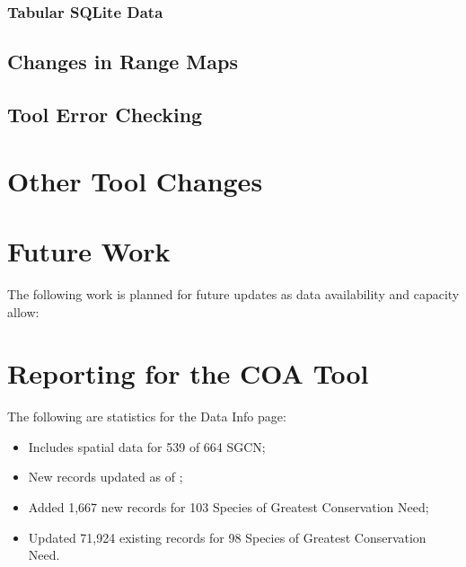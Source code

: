 \documentclass{article}\usepackage[]{graphicx}\usepackage[table]{xcolor}
\begin{document}
\subsubsection*{Tabular SQLite Data}
\noindent  

\subsection*{Changes in Range Maps}
\noindent  

\subsection*{Tool Error Checking}
\noindent  

\section*{Other Tool Changes}
\noindent 

\section*{Future Work}
The following work is planned for future updates as data availability and capacity allow:
\begin{itemize}
 
\end{itemize} 

\section*{Reporting for the COA Tool}

The following are statistics for the Data Info page: 
\begin{itemize}
 \item{Includes spatial data for 539 of 664 SGCN;}
 \item{New records updated as of ;}
 \item{Added 1,667 new records for 103 Species of Greatest Conservation Need;}
 \item{Updated 71,924 existing records for 98 Species of Greatest Conservation Need.}
\end{itemize}

\afterpage{\clearpage}
\end{document}
